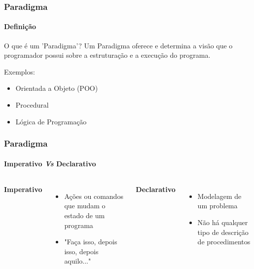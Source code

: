 \documentclass[aspectratio=169]{beamer}
\begin{document}
    \begin{frame}

      \frametitle{Paradigma}
      \framesubtitle{Definição}

      \begin{block}{O que é um 'Paradigma'?}
        Um Paradigma oferece e determina a visão que o programador possui sobre a estruturação
        e a execução do programa.
       \end{block} \pause 

       Exemplos:

       \begin{itemize}
         \item Orientada a Objeto (POO)
         \item Procedural
         \item Lógica de Programação
       \end{itemize}

    \end{frame}

    \begin{frame}
      \frametitle{Paradigma}
      \framesubtitle{Imperativo \emph{Vs} Declarativo}

      \pause

      \begin{columns}
        \textbf{Imperativo} 

        \begin{itemize}
          \item Ações ou comandos que mudam o estado de um programa 
          \item "Faça isso, depois isso, depois aquilo..." \pause
        \end{itemize}


        \textbf{Declarativo} 
        \begin{itemize}
          \item Modelagem de um problema 
          \item Não há qualquer tipo de descrição de procedimentos
        \end{itemize}

      \end{columns}
    \end{frame}
\end{document}
